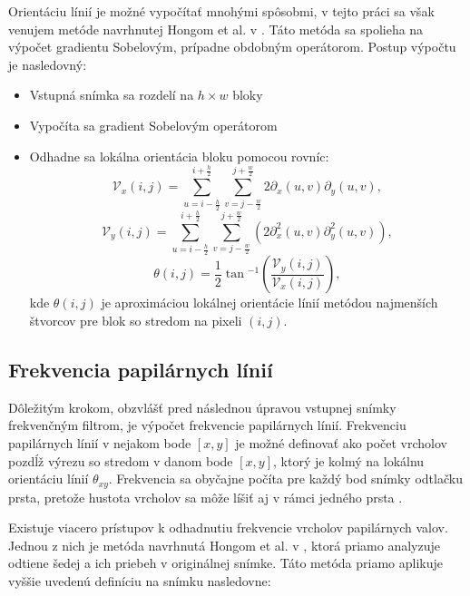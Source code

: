   Orientáciu línií je možné vypočítať mnohými spôsobmi, v tejto práci sa však venujem metóde navrhnutej Hongom et al. v \cite{Hong}.
  Táto metóda sa spolieha na výpočet gradientu Sobelovým, prípadne obdobným operátorom. Postup výpočtu je nasledovný:
  \begin{itemize}
    \item Vstupná snímka sa rozdelí na $h \times w$ bloky
    \item Vypočíta sa gradient Sobelovým operátorom
    \item Odhadne sa lokálna orientácia bloku pomocou rovníc:
          \begin{equation}
            \mathcal{V}_x(i,j) = \sum_{u=i-\frac{h}{2}}^{i+\frac{h}{2}}\sum_{v=j-\frac{w}{2}}^{j+\frac{w}{2}} 2\partial _{x}(u,v) \partial _y(u,v),
          \end{equation}
          \begin{equation}
            \mathcal{V}_y(i,j) = \sum_{u=i-\frac{h}{2}}^{i+\frac{h}{2}}\sum_{v=j-\frac{w}{2}}^{j+\frac{w}{2}} (2\partial ^{2}_{x}(u,v) \partial ^{2}_{y}(u,v)),
          \end{equation}
          \begin{equation}
            \theta{}(i,j) = \frac{1}{2}\tan{}^{-1}(\frac{\mathcal{V}_y(i,j)}{\mathcal{V}_x(i,j)}),
          \end{equation}
          kde $\theta{}(i,j)$ je aproximáciou lokálnej orientácie línií metódou najmenších štvorcov pre blok so stredom na pixeli $(i,j)$.
  \end{itemize}


  \subsection{Frekvencia papilárnych línií}
  Dôležitým krokom, obzvlášť pred následnou úpravou vstupnej snímky frekvenčným filtrom, je výpočet frekvencie papilárnych línií.
  Frekvenciu papilárnych línií v nejakom bode $[x,y]$ je možné definovať ako počet vrcholov pozdĺž výrezu so stredom v danom bode $[x,y]$,
  ktorý je kolmý na lokálnu orientáciu línií $\theta_{xy}$. Frekvencia sa obyčajne počíta pre každý bod snímky odtlačku prsta,
  pretože hustota vrcholov sa môže líšiť aj v rámci jedného prsta \cite{Handbook}.

  Existuje viacero prístupov k odhadnutiu frekvencie vrcholov papilárnych valov. Jednou z nich je metóda navrhnutá Hongom et al. v \cite{Hong},
  ktorá priamo analyzuje odtiene šedej a ich priebeh v originálnej snímke. Táto metóda priamo aplikuje vyššie uvedenú definíciu na snímku nasledovne:


